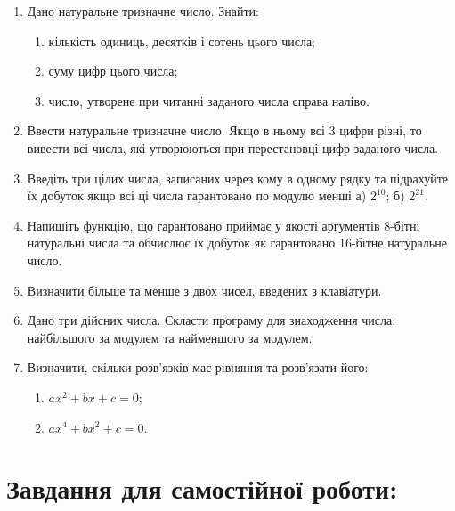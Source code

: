 \documentclass[a5paper,titlepage,openany,twoside,
]
{book_unv}%
\makeatletter
\newcommand{\xslalph}[1]{\expandafter\@xslalph\csname c@#1\endcsname}
\newcommand{\@xslalph}[1]{%
    \ifcase#1\or а\or б\or в\or г\or д\or e\or є\or ж\or з\or i%
    \or й\or к\or л\or м\or н\or о\or п\or р\or с\or т%
    \or у\or ф\or х\or ц\or ч\or ш\or ю\or я\or аа\or бб\or вв%
    \else\@ctrerr\fi%
}
\makeatother
\begin{document}
\begin{enumerate}
\def\labelenumi{\arabic{enumi})}
\item
Дано натуральне тризначне число. Знайти:
  \begin{enumerate}[label=\xslalph*)]
\item кількість одиниць, десятків і сотень цього числа;
\item суму цифр цього числа;
\item число, утворене при читанні заданого числа справа наліво.
\end{enumerate}

\item
Ввести натуральне тризначне число. Якщо в ньому всі 3 цифри різні, то
вивести всі числа, які утворюються при перестановці цифр заданого числа.
\item
Введіть три цілих числа, записаних через кому в одному рядку та
підрахуйте їх добуток якщо всі ці числа гарантовано по модулю менші а)
\(2^{10}\); б) \(2^{21}\).

\item
Напишіть функцію, що гарантовано приймає у якості аргументів 8-бітні
натуральні числа та обчислює їх добуток як гарантовано 16-бітне
натуральне число.
\item
Визначити більше та менше з двох чисел, введених з клавіатури.
\item
Дано три дійсних числа. Скласти програму для знаходження числа:
найбільшого за модулем та найменшого за модулем.
\item
Визначити, скільки розв'язків має рівняння та розв'язати його:
  \begin{multicols}{2}
  \begin{enumerate}[label=\xslalph*)]
\item \(ax^{2} + bx + c = 0\);
\item \(ax^{4} + bx^{2} + c = 0\).
  \end{enumerate}
  \end{multicols}

\end{enumerate}

\section{Завдання для самостійної роботи:}
\end{document}
